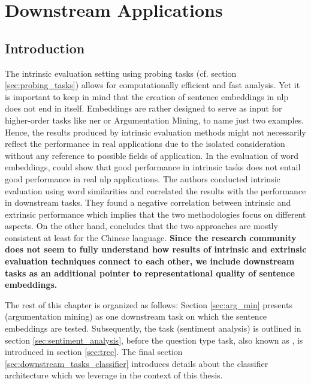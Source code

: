 %
%

\section{Downstream Applications}
\label{sec:downstream_applications}

\subsection{Introduction}
\label{sec:downstream_appl_intro}

The intrinsic evaluation setting using probing tasks (cf. section \vref{sec:probing_tasks}) allows for computationally efficient and fast analysis. Yet it is important to keep in mind that the creation of sentence embeddings in \gls{nlp} does not end in itself. Embeddings are rather designed to serve as input for higher-order tasks like \gls{ner} or Argumentation Mining, to name just two examples. Hence, the results produced by intrinsic evaluation methods might not necessarily reflect the performance in real applications due to the isolated consideration without any reference to possible fields of application. In the evaluation of word embeddings, \citep{Chiu.2016} could show that good performance in intrinsic tasks does not entail good performance in real \gls{nlp} applications. The authors conducted intrinsic evaluation using word similarities and correlated the results with the performance in downstream tasks. They found a negative correlation between intrinsic and extrinsic performance which implies that the two methodologies focus on different aspects. On the other hand, \citep{Qiu.2018} concludes that the two approaches are mostly consistent at least for the Chinese language. \textbf{Since the research community does not seem to fully understand how results of intrinsic and extrinsic evaluation techniques connect to each other, we include downstream tasks as an additional pointer to representational quality of sentence embeddings.}

The rest of this chapter is organized as follows: Section \vref{sec:arg_min} presents  (argumentation mining) as one downstream task on which the sentence embeddings are tested. Subsequently, the  task (sentiment analysis) is outlined in section \vref{sec:sentiment_analysis}, before the question type task, also known as , is introduced in section \vref{sec:trec}. The final section \vref{sec:downstream_tasks_classifier} introduces details about the classifier architecture which we leverage in the context of this thesis.

